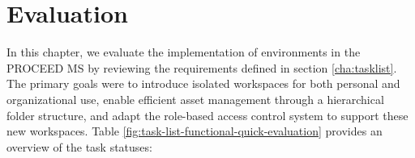 \chapter{Evaluation}
\label{cha:evaluation}

In this chapter, we evaluate the implementation of environments in the PROCEED MS by
reviewing the requirements defined in section \ref{cha:tasklist}.
The primary goals were to introduce isolated workspaces for both personal and organizational use,
enable efficient asset management through a hierarchical folder structure, and adapt the role-based access
control system to support these new workspaces.
Table \ref{fig:task-list-functional-quick-evaluation} provides an overview of the task statuses:

